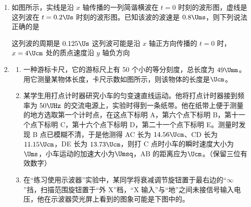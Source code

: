 \documentclass[\gkver]{gaokaozhenti}
\begin{document}
\begin{enumerate}

{B 中水银的内能增量大于 A 中水银的内能增量}
{A 和 B 中水银体积保持不变，故内能增量相同}
{A 和 B 中水银温度始终相同，故内能增量相同}


\item
如图所示，实线是沿 $x$ 轴传播的一列简谐横波在 $t=0$ 时刻的波形图，虚线是这列波在 $t=0.2\Us$ 时刻的波形图。已知该波的波速是 $0.8\Ums$，则下列说法正确的是


{这列波的周期是 $0.125\Us$}
{这列波可能是沿 $x$ 轴正方向传播的}
{$t=0$ 时，$x=4\Ucm$ 处的质点速度沿 $y$ 轴负方向}


\item
\begin{enumerate}
	\item
	一种游标卡尺，它的游标尺上有 50 个小的等分刻度，总长度为 $49\Umm$。用它测量某物体长度，卡尺示数如图所示，则该物体的长度是$\Ucm$。


	\item
	某学生用打点计时器研究小车的匀变速直线运动。他将打点计时器接到频率为 $50\UHz$ 的交流电源上，实验时得到一条纸带。他在纸带上便于测量的地方选取第一个计时点，在这点下标明 A，第六个点下标明 B，第十一个点下标明 C，第十六个点下标明 D，第二十一个点下标明 E。测量时发现 B 点已模糊不清，于是他测得 AC 长为 $14.56\Ucm$、CD 长为 $11.15\Ucm$，DE 长为 $13.73\Ucm$，则打 C 点时小车的瞬时速度大小为$\Ums$，小车运动的加速大小为$\Umsq$，AB 的距离应为$\Ucm$。（保留三位有效数字）


	\item
	在“练习使用示波器”实验中，某同学将衰减调节旋钮置于最右边的“$\infty$”挡，扫描范围旋钮置于“外 X”档，“X 输入”与“地”之间未接信号输入电压，他在示波器荧光屏上看到的图象可能是下图中的。


\end{enumerate}
\end{enumerate}
\end{document}
